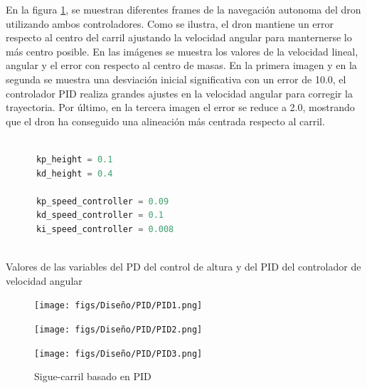 En la figura \ref{sigue-carril}, se muestran diferentes frames de la navegación autonoma 
del dron utilizando ambos controladores. Como se ilustra, el dron mantiene un error respecto al centro del carril ajustando la velocidad angular para manternerse lo más centro posible. En las imágenes
se muestra los valores de la velocidad lineal, angular y el error con respecto al centro de masas. En la primera imagen y en la segunda se muestra una desviación inicial significativa 
con un error de 10.0, el controlador
PID realiza grandes ajustes en la velocidad angular para corregir la trayectoria. Por último, en la tercera imagen el error se reduce a 2.0, mostrando que el dron ha conseguido una alineación 
más centrada respecto al carril. 
  \begin{code}[h]
    \begin{lstlisting}[language=Python]

      kp_height = 0.1
      kd_height = 0.4

      kp_speed_controller = 0.09
      kd_speed_controller = 0.1
      ki_speed_controller = 0.008
     
    \end{lstlisting}
    \caption[Valores de las variables del PD del control de altura y del PID del controlador de velocidad angular]{Valores de las variables del PD del control de altura y del PID del controlador de velocidad angular}
    \label{cod:ValoresPID}
    \end{code} 

    \begin{figure}[H]
      \centering
    
      \begin{minipage}[t]{0.3\textwidth}
          \centering
          \texttt{[image: figs/Diseño/PID/PID1.png]}
          \caption*{}
      \end{minipage}
      \hfill
      \begin{minipage}[t]{0.3\textwidth}
          \centering
          \texttt{[image: figs/Diseño/PID/PID2.png]}
          \caption*{}
      \end{minipage}
      \hfill
      \begin{minipage}[t]{0.3\textwidth}
          \centering
          \texttt{[image: figs/Diseño/PID/PID3.png]}
          \caption*{}
      \end{minipage}
      
      \caption{Sigue-carril basado en PID}
      \label{sigue-carril}
    \end{figure}

